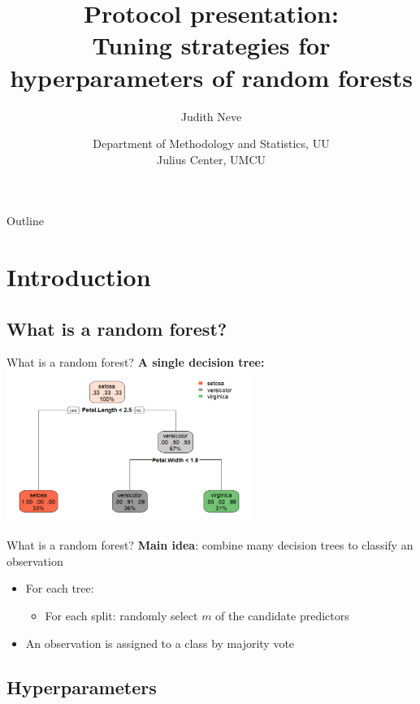 \documentclass[aspectratio=169]{beamer} %
\title{Protocol presentation:\\Tuning strategies for hyperparameters of random forests}
\author{Judith Neve}
\date{
  Department of Methodology and Statistics, UU\\
  Julius Center, UMCU
}
\begin{document}
  \titlepage

\begin{frame}{Outline}
    \tableofcontents
\end{frame}

\section{Introduction}

\subsection{What is a random forest?}

\begin{frame}{What is a random forest?}
    \textbf{A single decision tree:}\\
    \includegraphics[width = 0.6\textwidth]{000011.png}
\end{frame}

\begin{frame}{What is a random forest?}
    \textbf{Main idea}: combine many decision trees to classify an observation\\
    \begin{itemize}
        \item For each tree:
        \begin{itemize}
            \item For each split: randomly select $m$ of the candidate predictors
    \end{itemize}
    \item An observation is assigned to a class by majority vote
    \end{itemize}
\end{frame}

\subsection{Hyperparameters}
\end{document}
